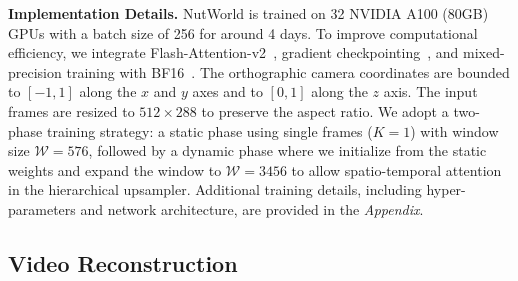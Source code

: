 






\noindent\textbf{Implementation Details.} NutWorld is trained on 32 NVIDIA A100 (80GB) GPUs with a batch size of 256 for around 4 days. 
To improve computational efficiency, we integrate Flash-Attention-v2~\cite{dao2022flashattention, dao2023flashattention}, gradient checkpointing~\cite{sohoni2019low}, and mixed-precision training with BF16~\cite{zamirai2020revisiting}.
The orthographic camera coordinates are bounded to $[-1, 1]$ along the $x$ and $y$ axes and to $[0, 1]$ along the $z$ axis. The input frames are resized to $512 \times 288$ to preserve the aspect ratio.
We adopt a two-phase training strategy: a static phase using single frames ($K=1$) with window size $\mathcal{W} = 576$, followed by a dynamic phase where we initialize from the static weights and expand the window to $\mathcal{W} = 3456$ to allow spatio-temporal attention in the hierarchical upsampler. Additional training details, including hyper-parameters and network architecture, are provided in the \textit{Appendix}.

\subsection{Video Reconstruction}


